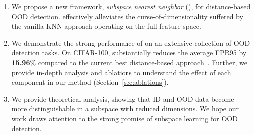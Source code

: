 \begin{enumerate}
    \item We propose a new framework, \emph{subspace nearest neighbor} (\name),  for distance-based OOD detection. \name effectively alleviates the curse-of-dimensionality suffered by the vanilla KNN approach operating on the full feature space.
    
    \item We demonstrate the strong performance of \name on an extensive collection of OOD detection tasks. On CIFAR-100, \name substantially reduces the average FPR95 by \textbf{15.96}\% compared to the current best distance-based approach~\cite{sun2022knn}. Further, we provide in-depth analysis and ablations to understand the effect of each component in our method (Section~\ref{sec:ablations}). 
    
    \item We provide theoretical analysis, showing that ID and OOD data become more distinguishable in a subspace with reduced dimensions. We hope our work draws attention to the strong promise of subspace learning for OOD detection.

\end{enumerate}





